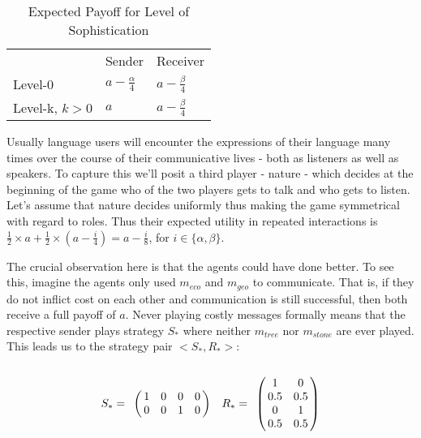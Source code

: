 \documentclass[10pt]{article}
\newcommand{\tb}[1]{\textcolor[rgb]{.8,.33,.0}{[TB: #1]}}%
\begin{document}
\begin{table}[h]
\centering
\caption{Expected Payoff for Level of Sophistication}
\begin{tabular}{lll}
                                    & Sender                                  & Receiver                                \\ \cline{2-3}
\multicolumn{1}{l|}{Level-0}        & \multicolumn{1}{l|}{$a-\tfrac{\alpha}{4}$} & \multicolumn{1}{l|}{$a-\tfrac{\beta}{4}$} \\ \cline{2-3}
\multicolumn{1}{l|}{Level-k, $k>0$} & \multicolumn{1}{l|}{$a$}                  & \multicolumn{1}{l|}{$a-\tfrac{\beta}{4}$} \\ \cline{2-3}
\end{tabular}
\end{table}
Usually language users will encounter the expressions of their language many times over the course of their communicative lives - both as listeners as well as speakers. To capture this we'll posit a third player - nature - which decides at the beginning of the game who of the two players gets to talk and who gets to listen. Let's assume that nature decides uniformly thus making the game symmetrical with regard to roles. Thus their expected utility in repeated interactions is $\tfrac{1}{2}\times a + \tfrac{1}{2}\times (a-\tfrac{i}{4})=a-\tfrac{i}{8}$, for $i\in \{\alpha,\beta \}$.

The crucial observation here is that the agents could have done better. To see this, imagine the agents only used $m_{eco}$ and $m_{geo}$ to communicate. That is, if they do not inflict cost on each other and communication is still successful, then both receive a full payoff of $a$. Never playing costly messages formally means that the respective sender plays strategy $S_*$ where neither $m_{tree}$ nor $m_{stone}$ are ever played. This leads us to the strategy pair $<S_*,R_*>$:
\begin{equation*}
S_*=
\bordermatrix{
            & & & &    \cr
 &       1 &    0      & 0       & 0 \cr
 &       0 &         0 & 1      & 0
 }\quad
R_*= \bordermatrix{
           &  & \cr
   & 1 & 0 \cr
    & 0.5 & 0.5 \cr
    & 0 & 1 \cr
    & 0.5 & 0.5 \cr
}
\end{equation*}
\end{document}
